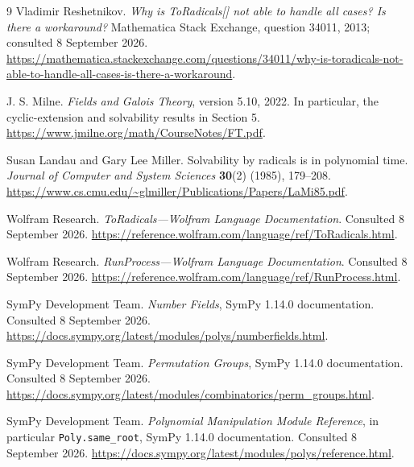 \documentclass[11pt,a4paper]{article}
\theoremstyle{definition}
\theoremstyle{remark}
\newcommand{\code}[1]{\texttt{#1}}
\begin{document}
\begin{thebibliography}{9}
Vladimir Reshetnikov.
\emph{Why is ToRadicals[] not able to handle all cases? Is there a workaround?}
Mathematica Stack Exchange, question 34011, 2013; consulted 8 September 2026.
\url{https://mathematica.stackexchange.com/questions/34011/why-is-toradicals-not-able-to-handle-all-cases-is-there-a-workaround}.

J. S. Milne.
\emph{Fields and Galois Theory}, version 5.10, 2022.
In particular, the cyclic-extension and solvability results in Section 5.
\url{https://www.jmilne.org/math/CourseNotes/FT.pdf}.

Susan Landau and Gary Lee Miller.
Solvability by radicals is in polynomial time.
\emph{Journal of Computer and System Sciences} \textbf{30}(2) (1985), 179--208.
\url{https://www.cs.cmu.edu/~glmiller/Publications/Papers/LaMi85.pdf}.

Wolfram Research.
\emph{ToRadicals---Wolfram Language Documentation}.
Consulted 8 September 2026.
\url{https://reference.wolfram.com/language/ref/ToRadicals.html}.

Wolfram Research.
\emph{RunProcess---Wolfram Language Documentation}.
Consulted 8 September 2026.
\url{https://reference.wolfram.com/language/ref/RunProcess.html}.

SymPy Development Team.
\emph{Number Fields}, SymPy 1.14.0 documentation.
Consulted 8 September 2026.
\url{https://docs.sympy.org/latest/modules/polys/numberfields.html}.

SymPy Development Team.
\emph{Permutation Groups}, SymPy 1.14.0 documentation.
Consulted 8 September 2026.
\url{https://docs.sympy.org/latest/modules/combinatorics/perm_groups.html}.

SymPy Development Team.
\emph{Polynomial Manipulation Module Reference}, in particular
\code{Poly.same\_root}, SymPy 1.14.0 documentation.
Consulted 8 September 2026.
\url{https://docs.sympy.org/latest/modules/polys/reference.html}.
\end{thebibliography}
\end{document}
